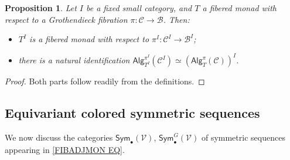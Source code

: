 \documentclass[a4paper,10pt
,draft
]{article}%
\numberwithin{equation}{section}
\numberwithin{figure}{section}
\newtheorem{proposition}[equation]{Proposition}%
\theoremstyle{definition} %
\newcommand{\V}{\ensuremath{\mathcal V}}
\newcommand{\1}{\ensuremath{\mathbbm 1}}%
\begin{document}
\begin{proposition}\label{DIAGRAMFM_PROP}
Let $I$ be a fixed small category, and $T$ a fibered monad with respect to a Grothendieck fibration 
$\pi \colon \mathcal{C} \to \mathcal{B}$. Then:
\begin{itemize}
\item[(i)] $T^I$ is a fibered monad with respect to $\pi^I\colon \mathcal{C}^I \to \mathcal{B}^I$;
\item[(ii)] there is a natural identification 
$\mathsf{Alg}_{T^I}^{\pi^I}(\mathcal{C}^I)
\simeq
\left(\mathsf{Alg}_T^{\pi}(\mathcal{C})\right)^I$.
\end{itemize}
\end{proposition}

\begin{proof}
Both parts follow readily from the definitions.
\end{proof}






\subsection{Equivariant colored symmetric sequences}
\label{EQCOSYMSEQ SEC}

We now discuss the categories
$\mathsf{Sym}_{\bullet}(\V)$,
$\mathsf{Sym}^G_{\bullet}(\V)$
of symmetric sequences appearing in \eqref{FIBADJMON EQ}.
\end{document}
